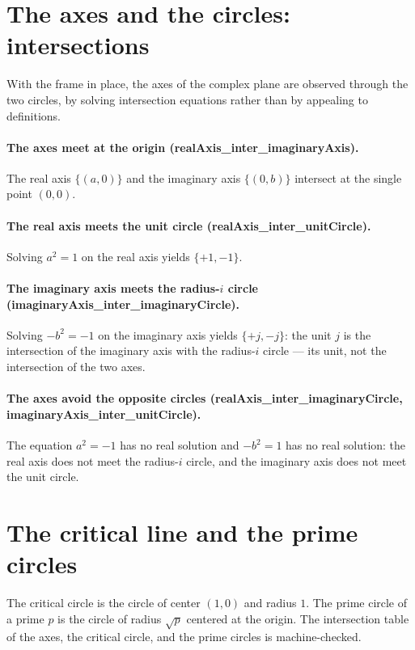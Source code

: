 \documentclass[sigplan,10pt,anonymous,review]{acmart}
\begin{document}
\section{The axes and the circles: intersections}

With the frame in place, the axes of the complex plane are observed
through the two circles, by solving intersection equations rather than
by appealing to definitions.

\paragraph{The axes meet at the origin (realAxis\_inter\_imaginaryAxis).}
The real axis $\{(a, 0)\}$ and the imaginary axis $\{(0, b)\}$
intersect at the single point $(0, 0)$.

\paragraph{The real axis meets the unit circle
(realAxis\_inter\_unitCircle).} Solving $a^2 = 1$ on the real axis
yields $\{+1, -1\}$.

\paragraph{The imaginary axis meets the radius-$i$ circle
(imaginaryAxis\_inter\_imaginaryCircle).} Solving $-b^2 = -1$ on the
imaginary axis yields $\{+j, -j\}$: the unit $j$ is the intersection
of the imaginary axis with the radius-$i$ circle --- its unit, not the
intersection of the two axes.

\paragraph{The axes avoid the opposite circles
(realAxis\_inter\_imaginaryCircle,
imaginaryAxis\_inter\_unitCircle).} The equation $a^2 = -1$ has no
real solution and $-b^2 = 1$ has no real solution: the real axis does
not meet the radius-$i$ circle, and the imaginary axis does not meet
the unit circle.

\section{The critical line and the prime circles}

The critical circle is the circle of center $(1, 0)$ and radius $1$.
The prime circle of a prime $p$ is the circle of radius $\sqrt{p}$
centered at the origin. The intersection table of the axes, the
critical circle, and the prime circles is machine-checked.
\end{document}
